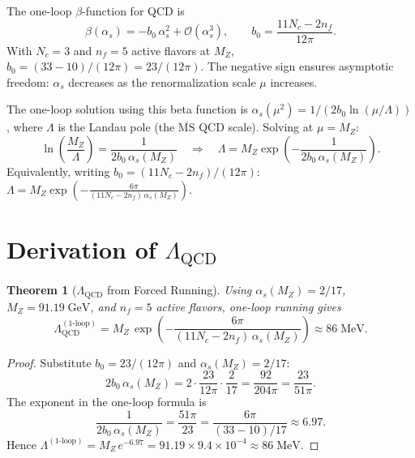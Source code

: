 \documentclass[12pt,a4paper]{article}
\newtheorem{theorem}{Theorem}[section]
\theoremstyle{definition}
\theoremstyle{remark}
\begin{document}
The one-loop $\beta$-function for QCD is
\begin{equation}
  \beta(\alpha_s) = -b_0 \, \alpha_s^2 + \mathcal{O}(\alpha_s^3),
  \qquad b_0 = \frac{11 N_c - 2 n_f}{12\pi}.
\end{equation}
With $N_c = 3$ and $n_f = 5$ active flavors at $M_Z$,
$b_0 = (33 - 10)/(12\pi) = 23/(12\pi)$.  The negative sign ensures
asymptotic freedom: $\alpha_s$ decreases as the renormalization scale
$\mu$ increases.

The one-loop solution using this beta function is
$\alpha_s(\mu^2) = 1/(2 b_0 \ln(\mu/\Lambda))$, where $\Lambda$
is the Landau pole (the $\overline{\mathrm{MS}}$ QCD scale).
Solving at $\mu = M_Z$:
\begin{equation}
  \ln\!\left(\frac{M_Z}{\Lambda}\right)
  = \frac{1}{2 b_0 \, \alpha_s(M_Z)}
  \quad \Rightarrow \quad
  \Lambda = M_Z \exp\!\left(-\frac{1}{2 b_0 \, \alpha_s(M_Z)}\right).
\end{equation}
Equivalently, writing $b_0 = (11N_c - 2n_f)/(12\pi)$:
$\Lambda = M_Z \exp\!\left(-\frac{6\pi}{(11N_c - 2n_f)\,\alpha_s(M_Z)}\right)$.

\section{Derivation of $\Lambda_{\mathrm{QCD}}$}
\label{sec:derivation}

\begin{theorem}[$\Lambda_{\mathrm{QCD}}$ from Forced Running]
\label{thm:lambda}
Using $\alpha_s(M_Z) = 2/17$, $M_Z = 91.19\;\mathrm{GeV}$,
and $n_f = 5$ active flavors, one-loop running gives
\begin{equation}
  \Lambda_{\mathrm{QCD}}^{(1\text{-loop})}
  = M_Z\,\exp\!\left(-\frac{6\pi}{(11N_c - 2n_f)\,\alpha_s(M_Z)}\right)
  \approx 86\;\mathrm{MeV}.
\end{equation}
\end{theorem}

\begin{proof}
Substitute $b_0 = 23/(12\pi)$ and $\alpha_s(M_Z) = 2/17$:
\begin{equation}
  2 b_0 \, \alpha_s(M_Z)
  = 2 \cdot \frac{23}{12\pi} \cdot \frac{2}{17}
  = \frac{92}{204\pi}
  = \frac{23}{51\pi}.
\end{equation}
The exponent in the one-loop formula is
\begin{equation}
  \frac{1}{2 b_0 \, \alpha_s(M_Z)}
  = \frac{51\pi}{23}
  = \frac{6\pi}{(33 - 10)/17}
  \approx 6.97.
\end{equation}
Hence $\Lambda^{(1\text{-loop})} = M_Z\, e^{-6.97} = 91.19 \times 9.4 \times 10^{-4}
\approx 86\;\mathrm{MeV}$.
\end{proof}
\end{document}
